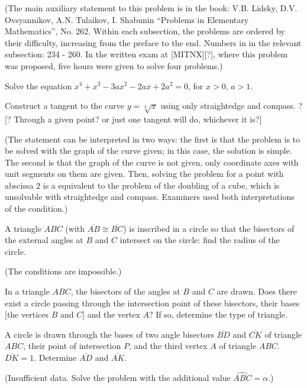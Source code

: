 \documentclass{article}
\begin{document}
(The main auxiliary statement to this problem is in the book:
V.B. Lidsky, D.V. Ovsyannikov, A.N. Tulaikov, I. Shabunin
``Problems in Elementary Mathematics'', No. 262.
Within each subsection, the problems are ordered by their difficulty, increasing from the preface to the end.
Numbers in in the relevant subsection: 234 - 260.
In the written exam at [MITNX][?], where this problem was proposed, five hours were given to solve four problems.)


\problem[{*}]
Solve the equation
$x^4 + x^3 - 3 a x^2 - 2 a x + 2 a^2 = 0$,
for $x > 0$, $a > 1$.


\problem
Construct a tangent to the curve $y = \sqrt[3]{x}$
using only straightedge and compass. \newline
?[? Through a given point? or just one tangent will do, whichever it is?]

(The statement can be interpreted in two ways:
the first is that the problem is to be solved with the graph of the curve given;
in this case, the solution is simple.
The second is that the graph of the curve is not given,
only coordinate axes with unit segments on them are given.
Then, solving the problem for a point with abscissa $2$ is a equivalent to the problem of the doubling of a cube,
which is unsolvable with straightedge and compass.
Examiners used both interpretations of the condition.)


A triangle $ABC$ (with $\overline{AB} \cong \overline{BC}$)
is inscribed in a circle so that the bisectors of the external angles at $B$ and $C$ intersect on the circle:
find the radius of the circle.

(The conditions are impossible.)


In a triangle $ABC$, the bisectors of the angles at $B$ and $C$ are drawn.
Does there exist a circle passing through the intersection point of these bisectors,
their bases [the vertices $B$ and $C$] and the vertex $A$?
If so, determine the type of triangle.


A circle is drawn through the bases of two angle bisectors
$\overline{BD}$ and $\overline{CK}$ of triangle $ABC$,
their point of intersection $P$,
and the third vertex $A$ of triangle $ABC$.
$\overline{DK} = 1$.
Determine $\overline{AD}$ and $\overline{AK}$.

(Insufficient data.
Solve the problem with the additional value $\widehat{ABC} = \alpha$.)
\end{document}
